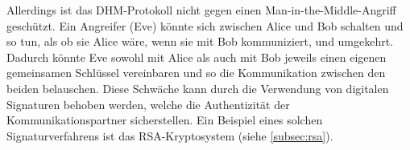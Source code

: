 Allerdings ist das DHM-Protokoll nicht gegen einen Man-in-the-Middle-Angriff geschützt. Ein Angreifer (Eve) könnte sich zwischen Alice und Bob schalten und so tun, als ob sie Alice wäre, wenn sie mit Bob kommuniziert, und umgekehrt. Dadurch könnte Eve sowohl mit Alice als auch mit Bob jeweils einen eigenen gemeinsamen Schlüssel vereinbaren und so die Kommunikation zwischen den beiden belauschen. Diese Schwäche kann durch die Verwendung von digitalen Signaturen behoben werden, welche die Authentizität der Kommunikationspartner sicherstellen. Ein Beispiel eines solchen Signaturverfahrens ist das \gls{RSA}-Kryptosystem (siehe \cref{subsec:rsa}).
